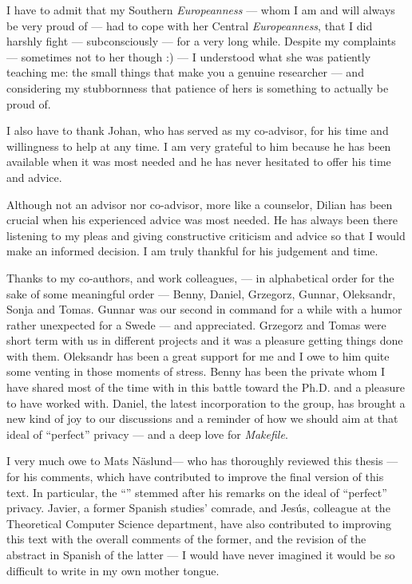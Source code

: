I have to admit that my Southern \emph{Europeanness} --- whom I am and will always 
be very proud of --- had to cope with her Central \emph{Europeanness}, that I did 
harshly fight --- subconsciously --- for a very long while. Despite my complaints 
--- sometimes not to her though :) --- I understood what she was patiently teaching 
me: the small things that make you a genuine researcher --- and considering my stubbornness 
that patience of hers is something to actually be proud of.

I also have to thank Johan, who has served as my co-advisor, for his time and willingness 
to help at any time. I am very grateful to him because he has been available when 
it was most needed and he has never hesitated to offer his time and advice. 

Although not an advisor nor co-advisor, more like a counselor, Dilian has been crucial 
when his experienced advice was most needed. He has always been there listening 
to my pleas and giving constructive criticism and advice so that I would make an 
informed decision. I am truly thankful for his judgement and time.

Thanks to my co-authors, and work colleagues, --- in alphabetical order for the 
sake of some meaningful order --- Benny, Daniel, Grzegorz, Gunnar, Oleksandr, Sonja 
and Tomas. Gunnar was our second in command for a while with a humor rather unexpected 
for a Swede --- and appreciated. Grzegorz and Tomas were short term with us in different 
projects and it was a pleasure getting things done with them. Oleksandr has been 
a great support for me and I owe to him quite some venting in those moments of stress. 
Benny has been the private whom I have shared most of the time with in this battle toward 
the Ph.D. and a pleasure to have worked with. Daniel, the latest incorporation 
to the group, has brought a new kind of joy to our discussions and a reminder of 
how we should aim at that ideal of ``perfect'' privacy --- and a deep love for 
\emph{Makefile}.

I very much owe to Mats N\"{a}slund--- who has thoroughly reviewed this thesis --- 
for his comments, which have contributed to improve the final version of this text. 
In particular, the  ``'' 
stemmed after his remarks on the ideal of ``perfect'' privacy. Javier, a former 
Spanish studies' comrade, and Jes\'{u}s, colleague at the Theoretical Computer Science 
department, have also contributed to improving this text with the overall comments 
of the former, and the revision of the abstract in Spanish of the latter --- I would 
have never imagined it would be so difficult to write in my own mother tongue. 

